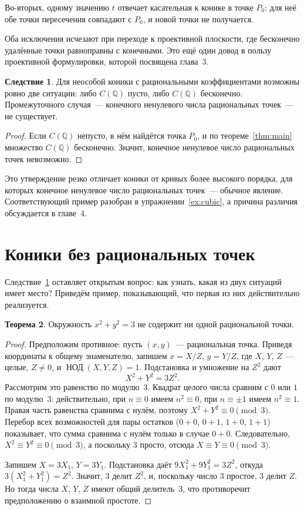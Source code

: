\documentclass[a4paper,14pt]{extreport}
\theoremstyle{definition}
\newtheorem{thm}{Теорема}[chapter]
\newtheorem{cor}[thm]{Следствие}
\newcommand{\Q}{\mathbb{Q}}
\providecommand{\gcdru}{}\renewcommand{\gcdru}{\mathop{\text{НОД}}\nolimits}
\begin{document}
Во-вторых, одному значению $t$ отвечает касательная к конике в точке $P_0$: для
неё обе точки пересечения совпадают с $P_0$, и новой точки не получается.

Оба исключения исчезают при переходе к проективной плоскости, где бесконечно
удалённые точки равноправны с конечными. Это ещё один довод в пользу
проективной формулировки, которой посвящена глава~3.

\begin{cor}\label{cor:dich}
Для неособой коники с рациональными коэффициентами возможны ровно две ситуации:
либо $C(\Q)$ пусто, либо $C(\Q)$ бесконечно. Промежуточного случая~--- конечного
ненулевого числа рациональных точек~--- не существует.
\end{cor}

\begin{proof}
Если $C(\Q)$ непусто, в нём найдётся точка $P_0$, и по теореме~\ref{thm:main}
множество $C(\Q)$ бесконечно. Значит, конечное ненулевое число рациональных
точек невозможно.
\end{proof}

Это утверждение резко отличает коники от кривых более высокого порядка, для
которых конечное ненулевое число рациональных точек~--- обычное явление.
Соответствующий пример разобран в упражнении~\ref{ex:cubic}, а причина различия
обсуждается в главе~4.

\section{Коники без рациональных точек}

Следствие~\ref{cor:dich} оставляет открытым вопрос: как узнать, какая из двух
ситуаций имеет место? Приведём пример, показывающий, что первая из них
действительно реализуется.

\begin{thm}\label{thm:three}
Окружность $x^2+y^2=3$ не содержит ни одной рациональной точки.
\end{thm}

\begin{proof}
Предположим противное: пусть $(x,y)$~--- рациональная точка. Приведя координаты
к общему знаменателю, запишем $x=X/Z$, $y=Y/Z$, где $X$, $Y$, $Z$~--- целые,
$Z\neq0$, и $\gcdru(X,Y,Z)=1$. Подстановка и умножение на $Z^2$ дают
\[
  X^2+Y^2=3Z^2 .
\]
Рассмотрим это равенство по модулю~3. Квадрат целого числа сравним с $0$ или
$1$ по модулю~3: действительно, при $n\equiv0$ имеем $n^2\equiv0$, при
$n\equiv\pm1$ имеем $n^2\equiv1$. Правая часть равенства сравнима с нулём,
поэтому $X^2+Y^2\equiv0\pmod 3$. Перебор всех возможностей для пары остатков
($0+0$, $0+1$, $1+0$, $1+1$) показывает, что сумма сравнима с нулём только в
случае $0+0$. Следовательно, $X^2\equiv Y^2\equiv 0 \pmod 3$, а поскольку 3
просто, отсюда $X\equiv Y\equiv 0\pmod 3$.

Запишем $X=3X_1$, $Y=3Y_1$. Подстановка даёт $9X_1^2+9Y_1^2=3Z^2$, откуда
$3(X_1^2+Y_1^2)=Z^2$. Значит, 3 делит $Z^2$, и, поскольку число 3 простое, 3 делит $Z$.
Но тогда числа $X$, $Y$, $Z$ имеют общий делитель~3, что противоречит
предположению о взаимной простоте.
\end{proof}
\end{document}
